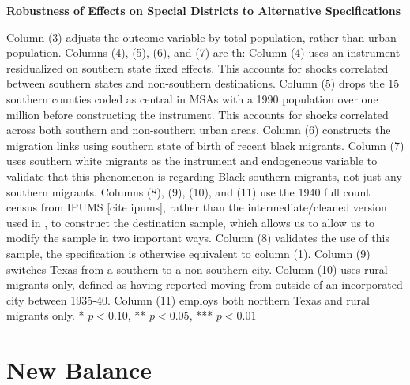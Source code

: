 \documentclass{article}
\begin{document}
\begin{landscape}
\begin{table}[ht]
\centering
\caption{\textbf{Robustness of Effects on Special Districts to Alternative Specifications}}
\begin{threeparttable}

\begin{tablenotes}\footnotesize
\item Column (3) adjusts the outcome variable by total population, rather than urban population. Columns (4), (5), (6), and (7) are th: Column (4) uses an instrument residualized on southern state fixed effects. This accounts for shocks correlated between southern states and non-southern destinations. Column (5) drops the 15 southern counties coded as central in MSAs with a 1990 population over one million before constructing the instrument. This accounts for shocks correlated across both southern and non-southern urban areas. Column (6) constructs the migration links using southern state of birth of recent black migrants. Column (7) uses southern white migrants as the instrument and endogeneous variable to validate that this phenomenon is regarding Black southern migrants, not just any southern migrants. Columns (8), (9), (10), and (11) use the 1940 full count census from IPUMS [cite ipums], rather than the intermediate/cleaned version used in , to construct the destination sample, which allows us to allow us to modify the sample in two important ways. Column (8) validates the use of this sample, the specification is otherwise equivalent to column (1). Column (9) switches Texas from a southern to a non-southern city. Column (10) uses rural migrants only, defined as having reported moving from outside of an incorporated city between 1935-40. Column (11) employs both northern Texas and rural migrants only.  * \(p<0.10\), ** \(p<0.05\), *** \(p<0.01\)
\end{tablenotes}
\end{threeparttable}
\label{tab:spdist_insts_pctile}
\end{table}
\end{landscape}


\section{New Balance}
\begin{table}[htbp]\centering 



\end{table}
\clearpage
\end{document}
